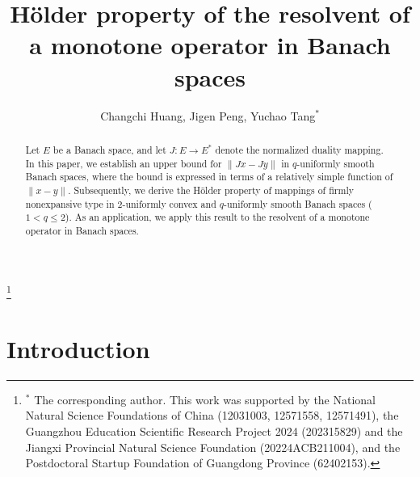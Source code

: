 \documentclass[12pt,a4paper]{amsart}
\theoremstyle{definition}
\numberwithin{equation}{section}
\begin{document}
\title[H\"{o}lder property of the resolvent of a monotone operator in Banach spaces ]
{{\bf H\"{o}lder property of the resolvent of a monotone operator in Banach spaces}}

\author{ Changchi Huang, Jigen Peng, Yuchao Tang$^*$ }


\address{ Changchi Huang:  School of Mathematics And Information Science, Guangzhou University,
Guangzhou, 510006, China}
\address{ Jigen Peng:   School of Mathematics And Information Science, Guangzhou University,
Guangzhou, 510006, China}
\address{ Yuchao Tang$^*$:   School of Mathematics And Information Science, Guangzhou University,
Guangzhou, 510006, China}




\thanks{$^*$ The corresponding author. This work was
supported by the National Natural Science Foundations of China (12031003, 12571558, 12571491), the Guangzhou Education Scientific Research Project 2024 (202315829) and the Jiangxi Provincial Natural Science Foundation (20224ACB211004), and the Postdoctoral Startup Foundation of Guangdong Province (62402153). }





\begin{abstract}
  Let $E$ be a Banach space, and let \(J: E \to E^{*}\) denote the normalized duality mapping. In this paper, we establish an upper bound for \( \|Jx - Jy\| \) in \( q \)-uniformly smooth Banach spaces, where the bound is expressed in terms of a relatively simple function of \(\|x - y\|\).  Subsequently, we derive the H\"{o}lder property of mappings of firmly nonexpansive type in 2-uniformly convex and $q$-uniformly smooth Banach spaces ($1<q\leq 2$). As an application,
  we apply this result to the resolvent of a monotone operator in Banach spaces.
\end{abstract}





\maketitle

\section{Introduction}
\end{document}
